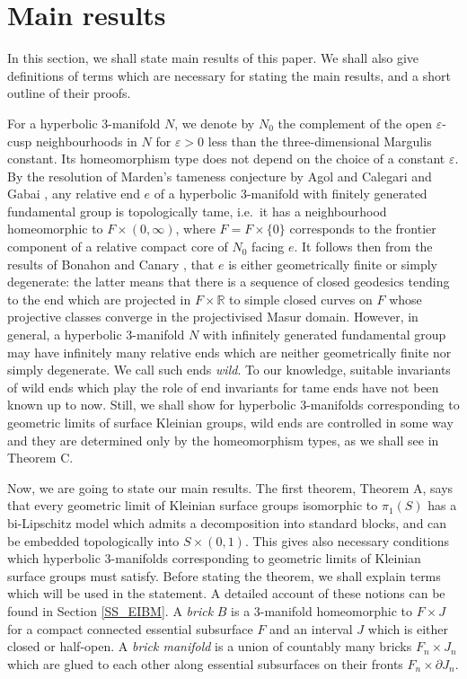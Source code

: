 \documentclass{amsart}
\theoremstyle{definition}
\numberwithin{figure}{section}
\numberwithin{equation}{section}
\newcommand{\blackboard}[1]{\ensuremath{\mathbb{#1}}}
\newcommand{\reals}{\blackboard{R}}
\newcommand{\ie}{i.e.\ }
\def\part{\partial}
\def\ve{\varepsilon}
\def\ve{\varepsilon}
\begin{document}
\section{Main results}
\label{main results}
In this section, we shall state main results of this paper.
We shall also give definitions of terms which are necessary for stating the main results, and a short outline of their proofs.

For a hyperbolic 3-manifold $N$, we denote by $N_0$  the complement 
 of the open $\ve$-cusp neighbourhoods in $N$ for $\ve >0$ less than the three-dimensional Margulis constant.
Its homeomorphism type does not depend on the choice of a constant $\ve$.
By the resolution of Marden's tameness conjecture by Agol \cite{ag} and Calegari and Gabai \cite{cg}, 
any relative end $e$ of a hyperbolic 3-manifold with finitely generated fundamental group 
is topologically tame, \ie it has a neighbourhood homeomorphic to $F \times (0,\infty)$, where $F=F\times \{0\}$ corresponds to the frontier component of a relative compact core of $N_0$ facing $e$.
It follows then from the results of Bonahon \cite{bon} and Canary \cite{ca1}, that $e$ is either geometrically finite 
or simply degenerate: the latter  means that there is a sequence of closed geodesics tending to the end which are projected in $F \times \reals$ to simple closed curves on $F$ whose projective classes  converge in the projectivised Masur domain.
However, in general, a hyperbolic 3-manifold $N$ with infinitely generated fundamental group may have infinitely many relative ends which are neither geometrically finite nor simply degenerate.
We call such ends \emph{wild}.
To our knowledge, suitable invariants of wild ends which play the role of end invariants for tame ends have  not been known up to now.
Still, we shall show for hyperbolic 3-manifolds corresponding to geometric limits of surface Kleinian groups, wild  ends are controlled in some way and they are determined only by the homeomorphism types, as we shall see in Theorem C.

Now, we are going to state our main results.
The first theorem, Theorem A, says that every geometric limit of Kleinian surface groups isomorphic to $\pi_1(S)$  has  a bi-Lipschitz model which admits a decomposition into standard blocks, and can be embedded topologically into $S \times (0,1)$.
This gives also  necessary conditions which hyperbolic 3-manifolds corresponding to geometric limits of Kleinian surface groups must satisfy.
Before stating the theorem, we shall explain terms which will be used in the statement.
A detailed account of these notions can be found in Section \ref{SS_EIBM}.
A \emph{brick} $B$ is a 3-manifold homeomorphic to $F\times J$ for a compact connected essential subsurface $F$ and an 
interval $J$ which is either closed or  half-open.
A \emph{brick manifold} is a union of countably many bricks $F_n\times J_n$ which are glued to each other along essential subsurfaces on their fronts 
$F_n\times \part J_n$.
\end{document}
